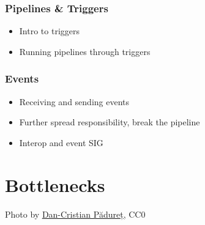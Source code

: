 \documentclass[aspectratio=169,11pt,hyperref={colorlinks=true}]{beamer}
\begin{document}
\begin{grayframe}
  \frametitle{Pipelines \& Triggers}
  \begin{itemize}
    \item Intro to triggers
    \item Running pipelines through triggers
  \end{itemize}
\end{grayframe}

\begin{grayframe}
  \frametitle{Events}
  \begin{itemize}
    \item Receiving and sending events
    \item Further spread responsibility, break the pipeline
    \item Interop and event SIG
  \end{itemize}
\end{grayframe}

\section[Bottlenecks]{Bottlenecks}
\begin{sectionwithpicrx}{Photo by \href{https://unsplash.com/@dancristianp}{\underline{Dan-Cristian Pădureț}}, CC0}
\end{sectionwithpicrx}
\end{document}
